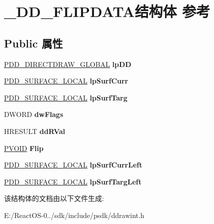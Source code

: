 \hypertarget{struct___d_d___f_l_i_p_d_a_t_a}{}\section{\+\_\+\+D\+D\+\_\+\+F\+L\+I\+P\+D\+A\+T\+A结构体 参考}
\label{struct___d_d___f_l_i_p_d_a_t_a}
\subsection*{Public 属性}
\begin{DoxyCompactItemize}
\item 
\mbox{\label{struct___d_d___f_l_i_p_d_a_t_a_a5c8de84623a4fc552e4cae94e3e34474}} 
\hyperlink{struct___d_d___d_i_r_e_c_t_d_r_a_w___g_l_o_b_a_l}{P\+D\+D\+\_\+\+D\+I\+R\+E\+C\+T\+D\+R\+A\+W\+\_\+\+G\+L\+O\+B\+AL} {\bfseries lp\+DD}
\item 
\mbox{\label{struct___d_d___f_l_i_p_d_a_t_a_a146d415fa28da10a59e0e1d68b7d4062}} 
\hyperlink{struct___d_d___s_u_r_f_a_c_e___l_o_c_a_l}{P\+D\+D\+\_\+\+S\+U\+R\+F\+A\+C\+E\+\_\+\+L\+O\+C\+AL} {\bfseries lp\+Surf\+Curr}
\item 
\mbox{\label{struct___d_d___f_l_i_p_d_a_t_a_a96b6ff03fa052dc3f405dc5041c1bed8}} 
\hyperlink{struct___d_d___s_u_r_f_a_c_e___l_o_c_a_l}{P\+D\+D\+\_\+\+S\+U\+R\+F\+A\+C\+E\+\_\+\+L\+O\+C\+AL} {\bfseries lp\+Surf\+Targ}
\item 
\mbox{\label{struct___d_d___f_l_i_p_d_a_t_a_a297df8e5e42117a7a87343dc90beced0}} 
D\+W\+O\+RD {\bfseries dw\+Flags}
\item 
\mbox{\label{struct___d_d___f_l_i_p_d_a_t_a_a9c6e37ac259a229bc417e7c6ce7a83a8}} 
H\+R\+E\+S\+U\+LT {\bfseries dd\+R\+Val}
\item 
\mbox{\label{struct___d_d___f_l_i_p_d_a_t_a_a214448881ed36027e81a60b1af81e6e8}} 
\hyperlink{interfacevoid}{P\+V\+O\+ID} {\bfseries Flip}
\item 
\mbox{\label{struct___d_d___f_l_i_p_d_a_t_a_aee8f2fd1395ef40ffaed0cc94c7d21ac}} 
\hyperlink{struct___d_d___s_u_r_f_a_c_e___l_o_c_a_l}{P\+D\+D\+\_\+\+S\+U\+R\+F\+A\+C\+E\+\_\+\+L\+O\+C\+AL} {\bfseries lp\+Surf\+Curr\+Left}
\item 
\mbox{\label{struct___d_d___f_l_i_p_d_a_t_a_a54bd88f9542497436451f1d0dcf113f7}} 
\hyperlink{struct___d_d___s_u_r_f_a_c_e___l_o_c_a_l}{P\+D\+D\+\_\+\+S\+U\+R\+F\+A\+C\+E\+\_\+\+L\+O\+C\+AL} {\bfseries lp\+Surf\+Targ\+Left}
\end{DoxyCompactItemize}


该结构体的文档由以下文件生成\+:\begin{DoxyCompactItemize}
\item 
E\+:/\+React\+O\+S-\/0../sdk/include/psdk/ddrawint.\+h\end{DoxyCompactItemize}

